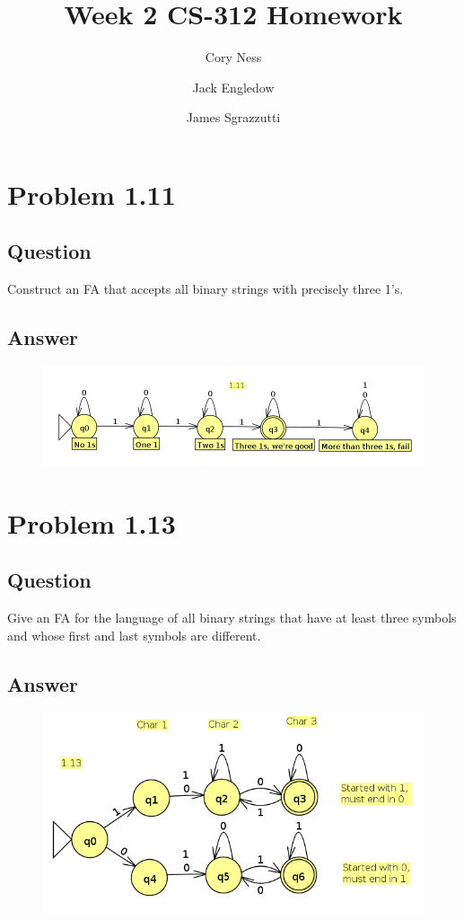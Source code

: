 \documentclass[12pt, a4paper]{article}
\title{Week 2 CS-312 Homework}
\author{
	Cory Ness
	\and
	Jack Engledow
	\and
	James Sgrazzutti
}
\begin{document}
\maketitle

\section{Problem 1.11}
\subsection{Question}
Construct an FA that accepts all binary strings with precisely three 1's.
\subsection{Answer}
\begin{figure}[H]
\includegraphics[scale=0.3]{1.11}
\end{figure}

\section{Problem 1.13}
\subsection{Question}
Give an FA for the language of all binary strings that have at least three symbols and whose first and last symbols are different.
\subsection{Answer}
\begin{figure}[H]
\includegraphics[scale=0.3]{1.13}
\end{figure}
\end{document}
